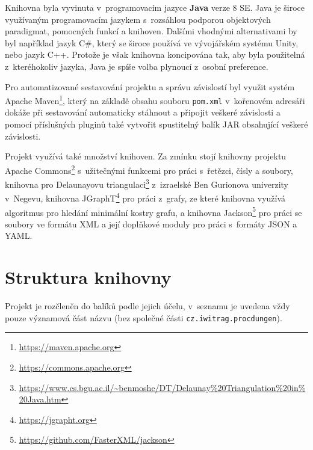 Knihovna byla vyvinuta v~programovacím jazyce \textbf{Java} verze 8 SE.
Java je široce využívaným programovacím jazykem s~rozsáhlou podporou objektových paradigmat, pomocných funkcí a knihoven.
Dalšími vhodnými alternativami by byl například jazyk C\#, který se široce používá ve vývojářském systému Unity, nebo jazyk C++.
Protože je však knihovna koncipována tak, aby byla použitelná z~kteréhokoliv jazyka, Java je spíše volba plynoucí z~osobní preference.
\par
Pro automatizované sestavování projektu a správu závislostí byl využit systém Apache Maven\footnote{\url{https://maven.apache.org}}, který na základě obsahu souboru \texttt{pom.xml} v~kořenovém adresáři dokáže při sestavování automaticky stáhnout a připojit veškeré závislosti a pomocí příslušných pluginů také vytvořit spustitelný balík JAR obsahující veškeré závislosti.
\par
Projekt využívá také množství knihoven.
Za zmínku stojí knihovny projektu Apache Commons\footnote{\url{https://commons.apache.org}} s~užitečnými funkcemi pro práci s~řetězci, čísly a soubory, knihovna pro Delaunayovu triangulaci\footnote{\url{https://www.cs.bgu.ac.il/~benmoshe/DT/Delaunay\%20Triangulation\%20in\%20Java.htm}} z~izraelské Ben Gurionova univerzity v~Negevu, knihovna JGraphT\footnote{\url{https://jgrapht.org}} pro práci z~grafy, ze které knihovna využívá algoritmus pro hledání minimální kostry grafu, a knihovna Jackson\footnote{\url{https://github.com/FasterXML/jackson}} pro práci se soubory ve formátu XML a její doplňkové moduly pro práci s~formáty JSON a YAML.


\section{Struktura knihovny}


Projekt je rozčleněn do balíků podle jejich účelu, v~seznamu je uvedena vždy pouze významová část názvu (bez společné části \texttt{cz.iwitrag.procdungen}).

